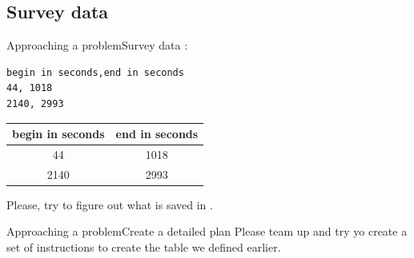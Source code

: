 \documentclass[aspectratio=169]{beamer}
\begin{document}
\subsection{Survey data}
\begin{frame}[fragile]{Approaching a problem}{Survey data}
:

\begin{lstlisting}[frame=single]
begin in seconds,end in seconds
44, 1018
2140, 2993
\end{lstlisting}
\pause
\vspace{1em}
\begin{tabular}{cc}
	\toprule
	begin in seconds & end in seconds \\
	\midrule
	44 & 1018 \\
	2140 & 2993 \\
	\bottomrule
\end{tabular}

\pause

\vspace{1em}
Please, try to figure out what is saved in .
\end{frame}

\begin{frame}{Approaching a problem}{Create a detailed plan}
	Please team up and try yo create a set of instructions to create the table we defined earlier.
\end{frame}
\end{document}
